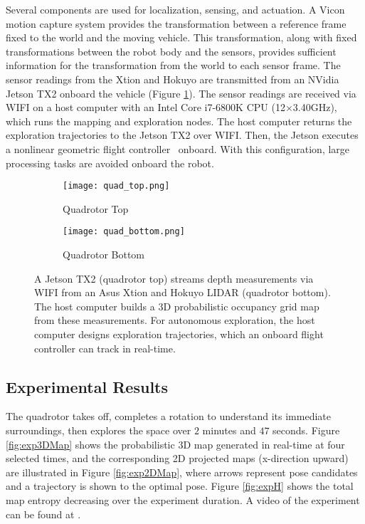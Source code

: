 Several components are used for localization, sensing, and actuation. A Vicon motion capture system provides the transformation between a reference frame fixed to the world and the moving vehicle. This transformation, along with fixed transformations between the robot body and the sensors, provides sufficient information for the transformation from the world to each sensor frame. The sensor readings from the Xtion and Hokuyo are transmitted from an NVidia Jetson TX2 onboard the vehicle (Figure \ref{fig:QuadrotorHardware}). The sensor readings are received via WIFI on a host computer with an Intel Core i7-6800K CPU (12$\times$3.40GHz), which runs the mapping and exploration nodes. The host computer returns the exploration trajectories to the Jetson TX2 over WIFI. Then, the Jetson executes a nonlinear geometric flight controller~\cite{GooDaeLee13} onboard. With this configuration, large processing tasks are avoided onboard the robot.
		
\begin{figure}[!t]
\centering
    	\begin{subfigure}[t]{0.44\columnwidth}
           	\centering
          	\texttt{[image: quad\_top.png]}
        		\caption{Quadrotor Top}
    	\end{subfigure}
	\hspace*{0.05\columnwidth}
    	\begin{subfigure}[t]{0.44\columnwidth}
           	\centering
          	\texttt{[image: quad\_bottom.png]}
        		\caption{Quadrotor Bottom}
    	\end{subfigure}
	\caption{A Jetson TX2 (quadrotor top) streams depth measurements via WIFI from an Asus Xtion and Hokuyo LIDAR (quadrotor bottom). The host computer builds a 3D probabilistic occupancy grid map from these measurements. For autonomous exploration, the host computer designs exploration trajectories, which an onboard flight controller can track in real-time.}
	\label{fig:QuadrotorHardware}
\end{figure}

\subsection{Experimental Results}
                
The quadrotor takes off, completes a rotation to understand its immediate surroundings, then explores the space over $2$ minutes and $47$ seconds. Figure \ref{fig:exp3DMap} shows the probabilistic 3D map generated in real-time at four selected times, and the corresponding 2D projected maps (x-direction upward) are illustrated in Figure \ref{fig:exp2DMap}, where arrows represent pose candidates and a trajectory is shown to the optimal pose. Figure \ref{fig:expH} shows the total map entropy decreasing over the experiment duration. A video of the experiment can be found at \href{https://www.youtube.com/watch?v=I_1rXV2XRqk}{}.

